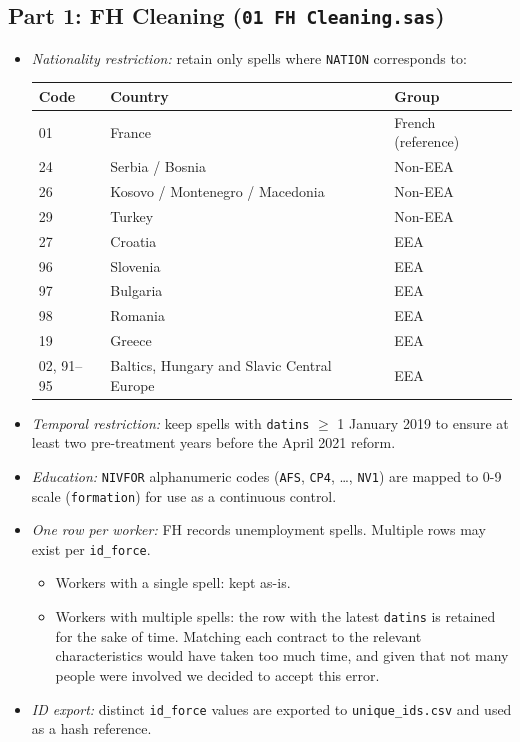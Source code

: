 \documentclass[10pt, a4paper]{article}
\begin{document}
\subsection*{Part 1: FH Cleaning \textnormal{\small(\texttt{01 FH Cleaning.sas})}}
\smallskip
\begin{itemize}
  \item \textit{Nationality restriction:} retain only spells where \texttt{NATION} corresponds to:
  \begin{center}
  \small
  \begin{tabular}{lll}
  \toprule
  Code & Country & Group \\
  \midrule
  01 & France & French (reference) \\
  24 & Serbia / Bosnia & Non-EEA \\
  26 & Kosovo / Montenegro / Macedonia & Non-EEA \\
  29 & Turkey & Non-EEA \\
  27 & Croatia & EEA \\
  96 & Slovenia & EEA \\
  97 & Bulgaria & EEA \\
  98 & Romania & EEA \\
  19 & Greece & EEA \\
  02, 91--95 & Baltics, Hungary and Slavic Central Europe & EEA \\
  \bottomrule
  \end{tabular}
  \end{center}
  \smallskip

  \item \textit{Temporal restriction:} keep spells with \texttt{datins} $\geq$
  1 January 2019 to ensure at least two pre-treatment years before the April 2021 reform.   \smallskip

  \item \textit{Education:} \texttt{NIVFOR} alphanumeric codes
  (\texttt{AFS}, \texttt{CP4}, \ldots, \texttt{NV1}) are mapped to 0-9 scale (\texttt{formation}) for use as a continuous control.   \smallskip

  \item \textit{One row per worker:} FH records unemployment spells. Multiple
  rows may exist per \texttt{id\_force}. 
  \begin{itemize}
    \item Workers with a single spell: kept as-is.
    \item Workers with multiple spells: the row with the latest \texttt{datins}
    is retained for the sake of time. Matching each contract to the relevant characteristics would have taken too much time, and given that not many people were involved we decided to accept this error.
  \end{itemize}   \smallskip

  \item \textit{ID export:} distinct \texttt{id\_force} values are exported to
  \texttt{unique\_ids.csv} and used as a hash reference.
\end{itemize}
\bigskip
\end{document}
